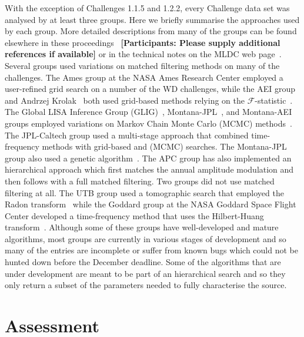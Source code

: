 \documentclass[12pt]{iopart}
\begin{document}
With the exception of Challenges 1.1.5 and 1.2.2, every Challenge data set was analysed by at least three groups. Here we briefly summarise the approaches used by each group. More detailed descriptions from many of the groups can be found elsewhere in these proceedings~\cite{nayak07, roever07, stroeer07} {\bf [Participants: Please supply additional references if available]} or in the technical notes on the MLDC web page~\cite{MLDCweb}. Several groups used variations on matched filtering methods on many of the challenges. The Ames group at the NASA Ames Research Center employed a user-refined grid search on a number of the WD challenges, while the AEI group and Andrzej Krolak~\cite{krolak04} both used grid-based methods relying on the $\mathcal{F}$-statistic~\cite{jaranowski98}. The Global LISA Inference Group (GLIG)~\cite{stroeer06,umstatter05,wickham06}, Montana-JPL~\cite{crowder06b}, and Montana-AEI groups employed variations on Markov Chain Monte Carlo (MCMC) methods~\cite{cornish06}. The JPL-Caltech group used a multi-stage approach that combined time-frequency methods with grid-based and (MCMC) searches. The Montana-JPL group also used a genetic algorithm~\cite{crowder06a}. The APC group has also implemented an hierarchical approach which first matches the annual amplitude modulation and then follows with a full matched filtering. Two groups did not use matched filtering at all. The UTB group used a tomographic search that employed the Radon transform~\cite{mohanty06} while the Goddard group at the NASA Goddard Space Flight Center developed a time-frequency method that uses the Hilbert-Huang transform~\cite{huang98}. Although some of these groups have well-developed and mature algorithms, most groups are currently in various stages of development and so many of the entries are incomplete or suffer from known bugs which could not be hunted down before the December deadline. Some of the algorithms that are under development are meant to be part of an hierarchical search and so they only return a subset of the parameters needed to fully characterise the source.

\section{Assessment}
\end{document}
